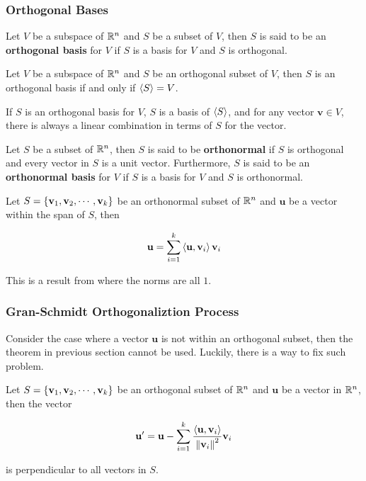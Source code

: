 \documentclass[a4paper,12pt]{article}
\begin{document}
\subsubsection{Orthogonal Bases}
\begin{dft}
  Let $V$ be a subspace of $\mathbb{R}^{n}$ and $S$ be a subset of $V$, then $S$ is said to be an \textbf{orthogonal basis} for $V$ if $S$ is a basis for $V$ and $S$ is orthogonal.
\end{dft}\n

\begin{thm}
  Let $V$ be a subspace of $\mathbb{R}^{n}$ and $S$ be an orthogonal subset of $V$, then $S$ is an orthogonal basis if and only if $\left\langle S\right\rangle=V$.
\end{thm}\n

\begin{crl}
  If $S$ is an orthogonal basis for $V$, $S$ is a basis of $\left\langle S\right\rangle$, and for any vector $\mathbf{v}\in V$, there is always a linear combination in terms of $S$ for the vector.
\end{crl}\n

\begin{dft}
  Let $S$ be a subset of $\mathbb{R}^{n}$, then $S$ is said to be \textbf{orthonormal} if $S$ is orthogonal and every vector in $S$ is a unit vector. Furthermore, $S$ is said to be an \textbf{orthonormal basis} for $V$ if $S$ is a basis for $V$ and $S$ is orthonormal.
\end{dft}\n

\begin{thm}
  Let $S=\left\{ \mathbf{v}_{1},\mathbf{v}_{2},\cdots,\mathbf{v}_{k}\right\}$ be an orthonormal subset of $\mathbb{R}^{n}$ and $\mathbf{u}$ be a vector within the span of $S$, then
  
  $$\mathbf{u}=\sum_{i=1}^{k}\left\langle \mathbf{u},\mathbf{v}_{i}\right\rangle\mathbf{v}_{i}$$\s
  
  \prf This is a result from \rthm[\sctr{5}] where the norms are all $1$.
\end{thm}

\subsubsection{Gran-Schmidt Orthogonaliztion Process}
Consider the case where a vector $\mathbf{u}$ is not within an orthogonal subset, then the theorem in previous section cannot be used. Luckily, there is a way to fix such problem.\n

\begin{thm}
  Let $S=\left\{ \mathbf{v}_{1},\mathbf{v}_{2},\cdots,\mathbf{v}_{k}\right\}$ be an orthogonal subset of $\mathbb{R}^{n}$ and $\mathbf{u}$ be a vector in $\mathbb{R}^{n}$, then the vector

  $$\mathbf{u}'=\mathbf{u}-\sum_{i=1}^{k}\frac{\left\langle \mathbf{u},\mathbf{v}_{i}\right\rangle}{\left\| \mathbf{v}_{i}\right\|^{2}}\mathbf{v}_{i}$$\s

  is perpendicular to all vectors in $S$.
\end{thm}\n
\end{document}
